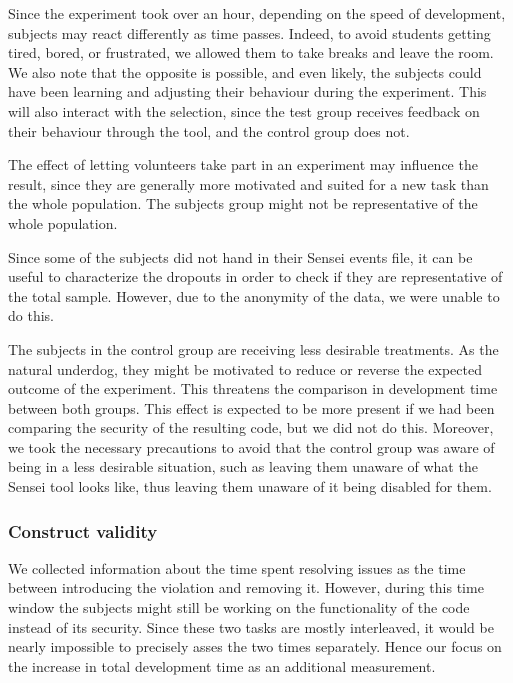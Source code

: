 Since the experiment took over an hour, depending on the speed of development, subjects may react differently as time passes.
Indeed, to avoid students getting tired, bored, or frustrated, we allowed them to take breaks and leave the room.
We also note that the opposite is possible, and even likely, the subjects could have been learning and adjusting their behaviour during the experiment.
This will also interact with the selection, since the test group receives feedback on their behaviour through the tool, and the control group does not.

The effect of letting volunteers take part in an experiment may influence the result, since they are generally more motivated and suited for a new task than the whole population.
The subjects group might not be representative of the whole population.

Since some of the subjects did not hand in their Sensei events file, it can be useful to characterize the dropouts in order to check if they are representative of the total sample.
However, due to the anonymity of the data, we were unable to do this.

The subjects in the control group are receiving less desirable treatments.
As the natural underdog, they might be motivated to reduce or reverse the expected outcome of the experiment.
This threatens the comparison in development time between both groups.
This effect is expected to be more present if we had been comparing the security of the resulting code, but we did not do this.
Moreover, we took the necessary precautions to avoid that the control group was aware of being in a less desirable situation, such as leaving them unaware of what the Sensei tool looks like, thus leaving them unaware of it being disabled for them.

\subsubsection{Construct validity}%
We collected information about the time spent resolving issues as the time between introducing the violation and removing it.
However, during this time window the subjects might still be working on the functionality of the code instead of its security.
Since these two tasks are mostly interleaved, it would be nearly impossible to precisely asses the two times separately.
Hence our focus on the increase in total development time as an additional measurement.

